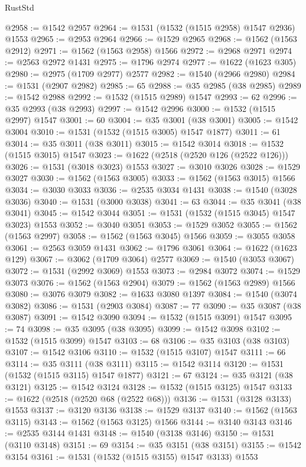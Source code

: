 \begin{lexlean}{RustStd}
\begin{coremodule}
@2958 := @1542 @2957
@2964 := @1531 (@1532 (@1515 @2958) @1547 @2936) @1553
@2965 := @2953 @2964
@2966 := @1529 @2965
@2968 := @1562 (@1563 @2912)
@2971 := @1562 (@1563 @2958) @1566
@2972 := @2968 @2971
@2974 := @2563 @2972 @1431
@2975 := @1796 @2974
@2977 := @1622 (@1623 @305)
@2980 := @2975 (@1709 @2977) @2577
@2982 := @1540 (@2966 @2980)
@2984 := @1531 (@2907 @2982)
@2985 := 65
@2988 := @35 @2985 (@38 @2985)
@2989 := @1542 @2988
@2992 := @1532 (@1515 @2989) @1547
@2993 := 62
@2996 := @35 @2993 (@38 @2993)
@2997 := @1542 @2996
@3000 := @1532 (@1515 @2997) @1547
@3001 := 60
@3004 := @35 @3001 (@38 @3001)
@3005 := @1542 @3004
@3010 := @1531 (@1532 (@1515 @3005) @1547 @1877)
@3011 := 61
@3014 := @35 @3011 (@38 @3011)
@3015 := @1542 @3014
@3018 := @1532 (@1515 @3015) @1547
@3023 := @1622 (@2518 (@2520 @126 (@2522 @126)))
@3026 := @1531 (@3018 @3023) @1553
@3027 := @3010 @3026
@3028 := @1529 @3027
@3030 := @1562 (@1563 @3005)
@3033 := @1562 (@1563 @3015) @1566
@3034 := @3030 @3033
@3036 := @2535 @3034 @1431
@3038 := @1540 (@3028 @3036)
@3040 := @1531 (@3000 @3038)
@3041 := 63
@3044 := @35 @3041 (@38 @3041)
@3045 := @1542 @3044
@3051 := @1531 (@1532 (@1515 @3045) @1547 @3023) @1553
@3052 := @3040 @3051
@3053 := @1529 @3052
@3055 := @1562 (@1563 @2997)
@3058 := @1562 (@1563 @3045) @1566
@3059 := @3055 @3058
@3061 := @2563 @3059 @1431
@3062 := @1796 @3061
@3064 := @1622 (@1623 @129)
@3067 := @3062 (@1709 @3064) @2577
@3069 := @1540 (@3053 @3067)
@3072 := @1531 (@2992 @3069) @1553
@3073 := @2984 @3072
@3074 := @1529 @3073
@3076 := @1562 (@1563 @2904)
@3079 := @1562 (@1563 @2989) @1566
@3080 := @3076 @3079
@3082 := @1633 @3080 @1397
@3084 := @1540 (@3074 @3082)
@3086 := @1531 (@2903 @3084)
@3087 := 77
@3090 := @35 @3087 (@38 @3087)
@3091 := @1542 @3090
@3094 := @1532 (@1515 @3091) @1547
@3095 := 74
@3098 := @35 @3095 (@38 @3095)
@3099 := @1542 @3098
@3102 := @1532 (@1515 @3099) @1547
@3103 := 68
@3106 := @35 @3103 (@38 @3103)
@3107 := @1542 @3106
@3110 := @1532 (@1515 @3107) @1547
@3111 := 66
@3114 := @35 @3111 (@38 @3111)
@3115 := @1542 @3114
@3120 := @1531 (@1532 (@1515 @3115) @1547 @1877)
@3121 := 67
@3124 := @35 @3121 (@38 @3121)
@3125 := @1542 @3124
@3128 := @1532 (@1515 @3125) @1547
@3133 := @1622 (@2518 (@2520 @68 (@2522 @68)))
@3136 := @1531 (@3128 @3133) @1553
@3137 := @3120 @3136
@3138 := @1529 @3137
@3140 := @1562 (@1563 @3115)
@3143 := @1562 (@1563 @3125) @1566
@3144 := @3140 @3143
@3146 := @2535 @3144 @1431
@3148 := @1540 (@3138 @3146)
@3150 := @1531 (@3110 @3148)
@3151 := 69
@3154 := @35 @3151 (@38 @3151)
@3155 := @1542 @3154
@3161 := @1531 (@1532 (@1515 @3155) @1547 @3133) @1553

\end{coremodule}
\end{lexlean}
